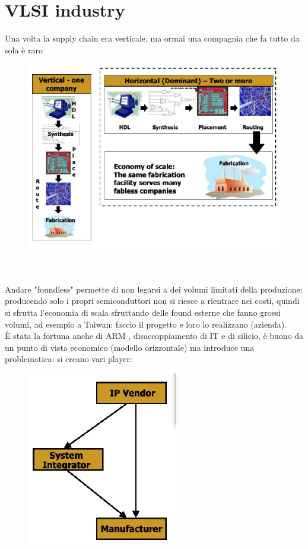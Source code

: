 \documentclass[oneside, 12pt]{extbook}
\begin{document}
\section{VLSI industry}
Una volta la supply chain era verticale, ma ormai una compagnia che fa tutto da sola è raro\\
\begin{figure}[!h]
	\includegraphics[scale=0.6]{immagini/hardware/supply_chain.png}
\end{figure}
\\\\Andare "foundless" permette di non legarsi a dei volumi limitati della produzione: producendo solo i propri semiconduttori non si riesce a rientrare nei costi, quindi si sfrutta l'economia di scala sfruttando delle found esterne che fanno grossi volumi, ad esempio a Taiwan: faccio il progetto e loro lo realizzano (azienda).
\\È stata la fortuna anche di ARM , disaccoppiamento di IT e di silicio, è buono da un punto di vista economico (modello orizzontale) ma introduce una problematica: si creano vari player:\\
\begin{figure}[!h]
	\includegraphics[scale=0.5]{immagini/hardware/trust_players.png}
	\caption{}
\end{figure}
\end{document}
